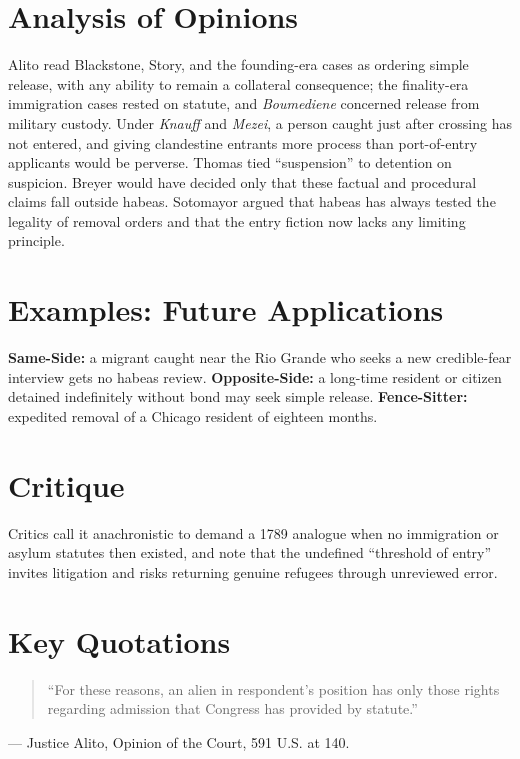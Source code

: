\documentclass[12pt]{article}
\begin{document}
\section{Analysis of Opinions}
Alito read Blackstone, Story, and the founding-era cases as ordering simple release, with any ability to remain a collateral consequence; the finality-era immigration cases rested on statute, and \textit{Boumediene} concerned release from military custody. Under \textit{Knauff} and \textit{Mezei}, a person caught just after crossing has not entered, and giving clandestine entrants more process than port-of-entry applicants would be perverse. Thomas tied ``suspension'' to detention on suspicion. Breyer would have decided only that these factual and procedural claims fall outside habeas. Sotomayor argued that habeas has always tested the legality of removal orders and that the entry fiction now lacks any limiting principle.

\section{Examples: Future Applications}
\textbf{Same-Side:} a migrant caught near the Rio Grande who seeks a new credible-fear interview gets no habeas review. \textbf{Opposite-Side:} a long-time resident or citizen detained indefinitely without bond may seek simple release. \textbf{Fence-Sitter:} expedited removal of a Chicago resident of eighteen months.

\section{Critique}
Critics call it anachronistic to demand a 1789 analogue when no immigration or asylum statutes then existed, and note that the undefined ``threshold of entry'' invites litigation and risks returning genuine refugees through unreviewed error.

\section{Key Quotations}
\begin{quote}
``For these reasons, an alien in respondent's position has only those rights regarding admission that Congress has provided by statute.''
\end{quote}
\noindent --- Justice Alito, Opinion of the Court, 591 U.S. at 140.
\end{document}
